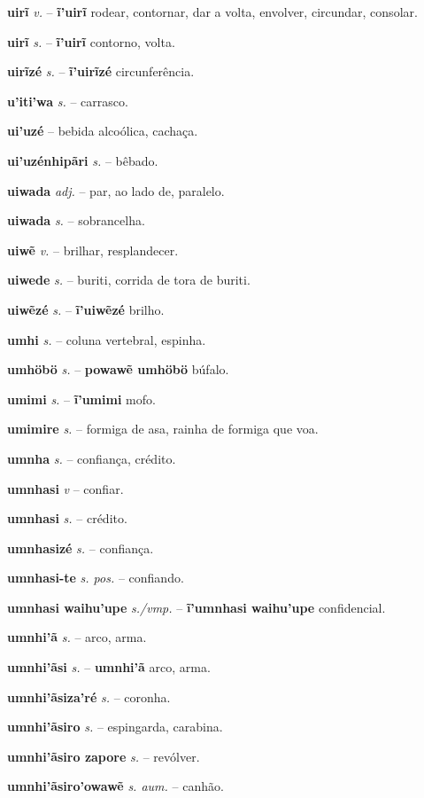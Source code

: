 \textbf{uirĩ} \textit{v.} -- \textbf{ĩ'uirĩ} rodear, contornar, dar a volta, envolver, circundar, consolar.

\textbf{uirĩ} \textit{s.} -- \textbf{ĩ'uirĩ} contorno, volta.

\textbf{uirĩzé} \textit{s.} -- \textbf{ĩ'uirĩzé} circunferência.

\textbf{u'iti'wa} \textit{s.} -- carrasco.

\textbf{ui'uzé} \textit{} -- bebida alcoólica, cachaça.

\textbf{ui'uzénhipãri} \textit{s.} -- bêbado.

\textbf{uiwada} \textit{adj.} -- par, ao lado de, paralelo.

\textbf{uiwada} \textit{s.} -- sobrancelha.

\textbf{uiwẽ} \textit{v.} -- brilhar, resplandecer.

\textbf{uiwede} \textit{s.} -- buriti, corrida de tora de buriti.

\textbf{uiwẽzé} \textit{s.} -- \textbf{ĩ'uiwẽzé} brilho.

\textbf{umhi} \textit{s.} -- coluna vertebral, espinha.

\textbf{umhöbö} \textit{s.} -- \textbf{powawẽ umhöbö} búfalo.

\textbf{umimi} \textit{s.} -- \textbf{ĩ'umimi} mofo.

\textbf{umimire} \textit{s.} -- formiga de asa, rainha de formiga que voa.

\textbf{umnha} \textit{s.} -- confiança, crédito.

\textbf{umnhasi} \textit{v} -- confiar.

\textbf{umnhasi} \textit{s.} -- crédito.

\textbf{umnhasizé} \textit{s.} -- confiança.

\textbf{umnhasi-te} \textit{s. pos.} -- confiando.

\textbf{umnhasi waihu'upe} \textit{s./vmp.} -- \textbf{ĩ'umnhasi waihu'upe} confidencial.

\textbf{umnhi'ã} \textit{s.} -- arco, arma.

\textbf{umnhi'ãsi} \textit{s.} -- \textbf{umnhi'ã} arco, arma.

\textbf{umnhi'ãsiza'ré} \textit{s.} -- coronha.

\textbf{umnhi'ãsiro} \textit{s.} -- espingarda, carabina.

\textbf{umnhi'ãsiro zapore} \textit{s.} -- revólver.

\textbf{umnhi'ãsiro'owawẽ} \textit{s. aum.} -- canhão.

